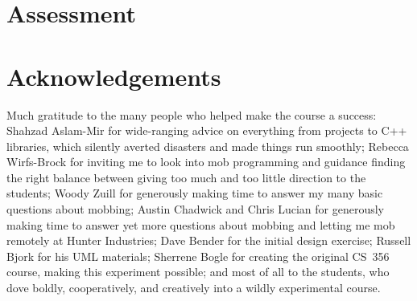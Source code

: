 \documentclass{article}
\begin{document}
\begin{comment}
Semester overview (put this in a small table).

Link to the complete syllabus.

``Software design'' is a highly ambiguous term. 

``common knowledge''

In an ordinary class, I would have demo'ed how to implement the finite state
machine, projecting my computer's screen to the whole class. Instead, we did
our first mob programming.

The day I improvised a lecture on agile vs. waterfall. Previous exposure had
given some students the impression that agile is hopelessly high-risk
because it has no discipline and other
students the impression that waterfall is hopelessly high-risk because it's
inflexible and assumes perfect forethought.

Some students had previous experience with Git and some did not.

No textbooks.

Hard to teach, easy to teach.

Danger: what if a prima donna shows up?

Finding a room

Problems: Not enough mobbing hours in the semester. A true community of
practice would meet nearly every day.
\end{comment}

\section{Assessment}

\section{Acknowledgements}

Much gratitude to the many people who helped make the course a success:
Shahzad Aslam-Mir for wide-ranging advice on everything from projects to C++
libraries, which silently
averted disasters and made things run smoothly;
Rebecca Wirfs-Brock for inviting me to look into mob programming and guidance
finding the right balance between giving too much and too little direction
to the students;
Woody Zuill for generously making time to answer my many basic questions
about mobbing;
Austin Chadwick and Chris Lucian for generously making time to answer yet more
questions about mobbing and letting me mob remotely at Hunter Industries;
Dave Bender for the initial design exercise;
Russell Bjork for his UML materials;
Sherrene Bogle for creating the original CS~356 course, making this experiment
possible;
and most of all to the students, who dove boldly, cooperatively, and
creatively into a wildly experimental course.
\end{document}
